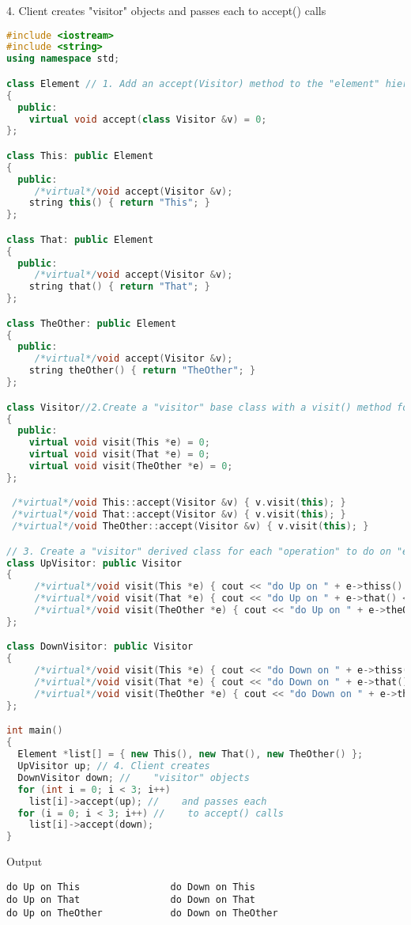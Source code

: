 \documentclass{book}
\begin{document}
4.    Client creates "visitor" objects and passes each to accept() calls
\begin{lstlisting}[caption={visitor pattern sample code},label={lst:vps23},language=C++]
#include <iostream>
#include <string>
using namespace std;

class Element // 1. Add an accept(Visitor) method to the "element" hierarchy
{
  public:
    virtual void accept(class Visitor &v) = 0;
};

class This: public Element
{
  public:
     /*virtual*/void accept(Visitor &v);
    string this() { return "This"; }
};

class That: public Element
{
  public:
     /*virtual*/void accept(Visitor &v);
    string that() { return "That"; }
};

class TheOther: public Element
{
  public:
     /*virtual*/void accept(Visitor &v);
    string theOther() { return "TheOther"; }
};

class Visitor//2.Create a "visitor" base class with a visit() method for every "element" type
{
  public:
    virtual void visit(This *e) = 0;
    virtual void visit(That *e) = 0;
    virtual void visit(TheOther *e) = 0;
};

 /*virtual*/void This::accept(Visitor &v) { v.visit(this); }
 /*virtual*/void That::accept(Visitor &v) { v.visit(this); }
 /*virtual*/void TheOther::accept(Visitor &v) { v.visit(this); }

// 3. Create a "visitor" derived class for each "operation" to do on "elements"
class UpVisitor: public Visitor
{
     /*virtual*/void visit(This *e) { cout << "do Up on " + e->thiss() << '\n'; }
     /*virtual*/void visit(That *e) { cout << "do Up on " + e->that() << '\n'; }
     /*virtual*/void visit(TheOther *e) { cout << "do Up on " + e->theOther() << '\n';}
};

class DownVisitor: public Visitor
{
     /*virtual*/void visit(This *e) { cout << "do Down on " + e->thiss() << '\n'; }
     /*virtual*/void visit(That *e) { cout << "do Down on " + e->that() << '\n'; }
     /*virtual*/void visit(TheOther *e) { cout << "do Down on " + e->theOther() << '\n'; }
};

int main()
{
  Element *list[] = { new This(), new That(), new TheOther() };
  UpVisitor up; // 4. Client creates
  DownVisitor down; //    "visitor" objects
  for (int i = 0; i < 3; i++)
    list[i]->accept(up); //    and passes each
  for (i = 0; i < 3; i++) //    to accept() calls
    list[i]->accept(down);
}
\end{lstlisting}
Output
\begin{verbatim}
do Up on This                do Down on This
do Up on That                do Down on That
do Up on TheOther            do Down on TheOther
\end{verbatim}
\end{document}
